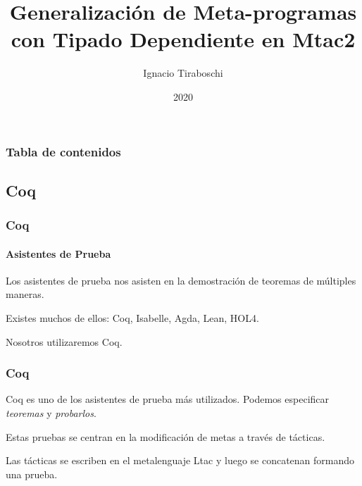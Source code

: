 \documentclass{beamer}
\title[Generalización de Meta-programas]{Generalización de Meta-programas con Tipado Dependiente en Mtac2}
\author{Ignacio Tiraboschi}
\institute{UNC - FAMAF}
\date{2020}
\begin{document}
\frame{\titlepage}

\begin{frame}
\frametitle{Tabla de contenidos}
\tableofcontents
\end{frame}

\begin{frame}
\section{Coq}
\frametitle{Coq}
\framesubtitle{Asistentes de Prueba}

Los asistentes de prueba nos asisten en la demostración de teoremas de múltiples maneras.
\vspace{\baselineskip}

Existes muchos de ellos: Coq, Isabelle, Agda, Lean, HOL4.
\vspace{\baselineskip}

Nosotros utilizaremos Coq.

\end{frame}

\begin{frame}
\frametitle{Coq}
Coq es uno de los asistentes de prueba más utilizados.
Podemos especificar \emph{teoremas} y \emph{probarlos}.
\vspace{\baselineskip}

Estas pruebas se centran en la modificación de metas a través de tácticas.
\vspace{\baselineskip}

Las tácticas se escriben en el metalenguaje Ltac y luego se concatenan formando una prueba.
\end{frame}

\end{document}
